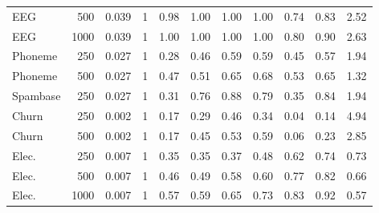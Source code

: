 \begin{tabular}{lrrrrrrrrrr}
EEG & 500 & 0.039 & 1 & 0.98 & 1.00 & 1.00 & 1.00 & 0.74 & 0.83 & 2.52 \\
EEG & 1000 & 0.039 & 1 & 1.00 & 1.00 & 1.00 & 1.00 & 0.80 & 0.90 & 2.63 \\
Phoneme & 250 & 0.027 & 1 & 0.28 & 0.46 & 0.59 & 0.59 & 0.45 & 0.57 & 1.94 \\
Phoneme & 500 & 0.027 & 1 & 0.47 & 0.51 & 0.65 & 0.68 & 0.53 & 0.65 & 1.32 \\
Spambase & 250 & 0.027 & 1 & 0.31 & 0.76 & 0.88 & 0.79 & 0.35 & 0.84 & 1.94 \\
Churn & 250 & 0.002 & 1 & 0.17 & 0.29 & 0.46 & 0.34 & 0.04 & 0.14 & 4.94 \\
Churn & 500 & 0.002 & 1 & 0.17 & 0.45 & 0.53 & 0.59 & 0.06 & 0.23 & 2.85 \\
Elec. & 250 & 0.007 & 1 & 0.35 & 0.35 & 0.37 & 0.48 & 0.62 & 0.74 & 0.73 \\
Elec. & 500 & 0.007 & 1 & 0.46 & 0.49 & 0.58 & 0.60 & 0.77 & 0.82 & 0.66 \\
Elec. & 1000 & 0.007 & 1 & 0.57 & 0.59 & 0.65 & 0.73 & 0.83 & 0.92 & 0.57 \\
\bottomrule
\end{tabular}
